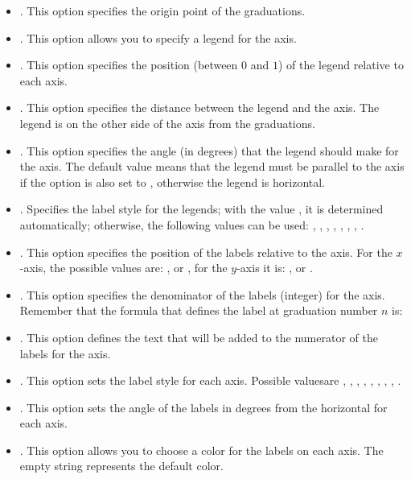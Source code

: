 \begin{itemize}
\begin{itemize}
    The formula that defines the label at tick mark number $n$ is: 

        \item {}. This option specifies the origin point of the graduations.
        
        \item {}. This option allows you to specify a legend for the axis.
        \item {}. This option specifies the position (between $0$ and $1$) of the legend relative to each axis.
        \item {}. This option specifies the distance between the legend and the axis. The legend is on the other side of the axis from the graduations.
        \item {}. This option specifies the angle (in degrees) that the legend should make for the axis. The default value  means that the legend must be parallel to the axis if the  option is also set to , otherwise the legend is horizontal.
        \item {}. Specifies the label style for the legends; with the value , it is determined automatically; otherwise, the following values ​​can be used:  , , , , , , , .
        \item {}. This option specifies the position of the labels relative to the axis. For the $x$-axis, the possible values ​​are: ,  or , for the $y$-axis it is:  ,  or .

        \item {}. ​​This option specifies the denominator of the labels (integer) for the axis. Remember that the formula that defines the label at graduation number $n$ is: 
        \item {}. This option defines the text that will be added to the numerator of the labels for the axis.
        \item {}. This option sets the label style for each axis. Possible values ​​are , , , , , , , , .
        \item {}. This option sets the angle of the labels in degrees from the horizontal for each axis.
        \item {}. This option allows you to choose a color for the labels on each axis. The empty string represents the default color.
        

\end{itemize}
\end{itemize}
